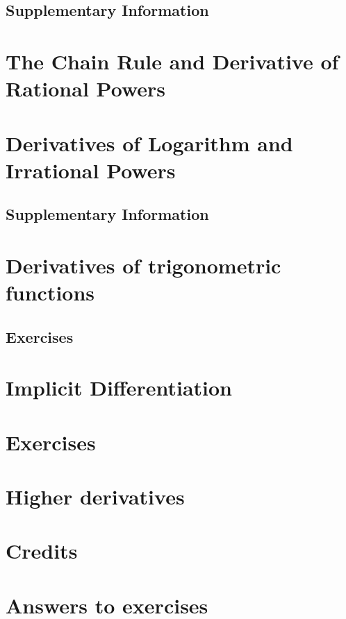 \documentclass{fts_m2}
\begin{document}
    \subsection*{Supplementary Information}
    
    \fi

    \section{The Chain Rule and Derivative of Rational Powers}
    

    \section{Derivatives of Logarithm and Irrational Powers}
    
    \ifcompilesupp
    \subsection*{Supplementary Information}
    
    \fi
    
    \section{Derivatives of trigonometric functions}
    
    \ifcompilesupp
    \subsection*{Exercises}
    
    \fi
    
    \section{Implicit Differentiation}
    
    \section*{Exercises}
    

    \section{Higher derivatives}
    

    \appendix

    \section{Credits}
    
    
    \section{Answers to exercises}
    
\end{document}
